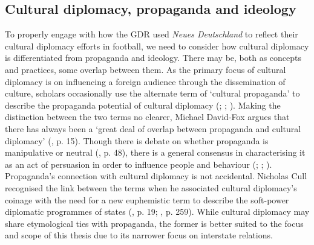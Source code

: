 \subsection*{Cultural diplomacy, propaganda and ideology}

To properly engage with how the GDR used \textit{Neues Deutschland} to reflect their cultural diplomacy efforts in football, we need to consider how cultural diplomacy is differentiated from propaganda and ideology. There may be, both as concepts and practices, some overlap between them. As the primary focus of cultural diplomacy is on influencing a foreign audience through the dissemination of culture, scholars occasionally use the alternate term of ‘cultural propaganda’ to describe the propaganda potential of cultural diplomacy (\cite{prevots1998}; \cite{david-fox2011}; \cite{faircloughwiggins2016}). Making the distinction between the two terms no clearer, Michael David-Fox argues that there has always been a ‘great deal of overlap between propaganda and cultural diplomacy’ (\citeyear{david-fox2011}, p. 15). Though there is debate on whether propaganda is manipulative or neutral (\cite{diggs-brown2011}, p. 48), there is a general consensus in characterising it as an act of persuasion in order to influence people and behaviour (\cite{blackroberts2011}; \cite{auerbachcastronovo2013}; \cite{milleretal2016}). Propaganda’s connection with cultural diplomacy is not accidental. Nicholas Cull recognised the link between the terms when he associated cultural diplomacy’s coinage with the need for a new euphemistic term to describe the soft-power diplomatic programmes of states (\citeyear{cull2008a}, p. 19; \citeyear{cull2008b}, p. 259). While cultural diplomacy may share etymological ties with propaganda, the former is better suited to the focus and scope of this thesis due to its narrower focus on interstate relations.

